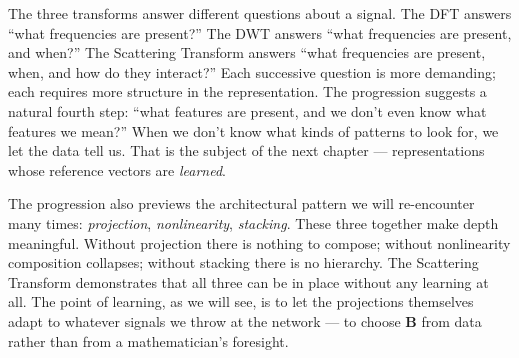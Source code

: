 The three transforms answer different questions about a signal.  The
DFT answers ``what frequencies are present?''  The DWT answers ``what
frequencies are present, and when?''  The Scattering Transform
answers ``what frequencies are present, when, and how do they
interact?''  Each successive question is more demanding; each requires
more structure in the representation.  The progression suggests a
natural fourth step: ``what features are present, and we don't even
know what features we mean?''  When we don't know what kinds of
patterns to look for, we let the data tell us.  That is the subject of
the next chapter --- representations whose reference vectors are
\emph{learned}.

The progression also previews the architectural pattern we will
re-encounter many times: \emph{projection}, \emph{nonlinearity},
\emph{stacking}.  These three together make depth meaningful.  Without
projection there is nothing to compose; without nonlinearity composition
collapses; without stacking there is no hierarchy.  The Scattering
Transform demonstrates that all three can be in place without any
learning at all.  The point of learning, as we will see, is to let the
projections themselves adapt to whatever signals we throw at the
network --- to choose $\mathbf{B}$ from data rather than from a
mathematician's foresight.
